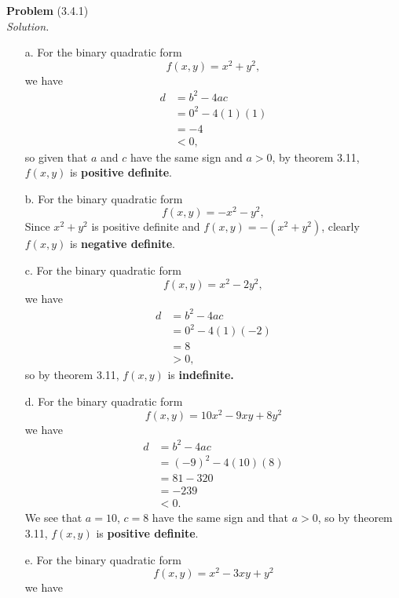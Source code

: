 \documentclass[12 pt]{amsart}
\begin{document}
\phantom{\quad} \vfill
\noindent
\textbf{Problem} (3.4.1) \\[4ex]
\emph{Solution.} \\[2ex]
	\begin{enumerate}
		\item[a.]
      For the binary quadratic form
      \[
        f(x,y) = x^2 + y^2,
      \]
      we have
      \begin{align*}
        d &= b^2 - 4ac \\
          &= 0^2 - 4 (1)(1) \\
          &= -4 \\
          &< 0,
      \end{align*}
      so given that $a$ and $c$
      have the same sign and $a > 0$, 
      by theorem 3.11, $f(x,y)$ is 
      \textbf{positive definite}.
		\item[b.]
      For the binary quadratic form
      \[
        f(x,y) = -x^2 - y^2,
      \]
      Since $x^2 + y^2$ is positive definite
      and $f(x,y) = -(x^2 + y^2)$, 
      clearly $f(x,y)$ is \textbf{negative definite}.
		\item[c.]
     For the binary quadratic form
      \[
        f(x,y) = x^2 - 2y^2,
      \]
      we have
      \begin{align*}
        d &= b^2 - 4ac \\
          &= 0^2 - 4 (1)(-2) \\
          &= 8 \\
          &> 0,
      \end{align*}
      so by theorem 3.11, 
      $f(x,y)$ is \textbf{indefinite.}
		\item[d.]
     For the binary quadratic form
      \[
        f(x,y) = 10x^2 - 9xy + 8y^2
      \]
      we have
      \begin{align*}
        d &= b^2 - 4ac \\
          &= (-9)^2 - 4(10)(8) \\
          &= 81 - 320 \\
          &= -239 \\
          &< 0.
      \end{align*}
      We see that $a = 10$, $c = 8$ have the same sign
      and that $a > 0$,
      so by theorem 3.11, 
      $f(x,y)$ is \textbf{positive definite}.
		\item[e.]
     For the binary quadratic form
      \[
        f(x,y) = x^2 - 3xy + y^2
      \]
      we have
      \begin{align*}

\end{align*}
\end{enumerate}
\end{document}
